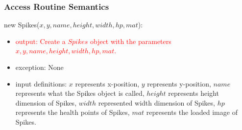 \documentclass[12pt]{article}
\newcommand{\m}[1]{\mbox{#1}}
\begin{document}






\subsubsection*{Access Routine Semantics}

new Spikes($x, y, name, height, width, hp, mat$):
\begin{itemize}
    \item \textcolor{red}{output: Create a $Spikes$ object with the parameters $x, y, name, height, width, hp, mat$.}
    \item exception: None
    \item input definitions: $x$ represents x-position, $y$ represents y-position, $name$ represents what the Spikes object is called, $height$ represents height dimension of Spikes, $width$ represented width dimension of Spikes, $hp$ represents the health points of Spikes, $mat$ represents the loaded image of Spikes.
\end{itemize}
\end{document}
